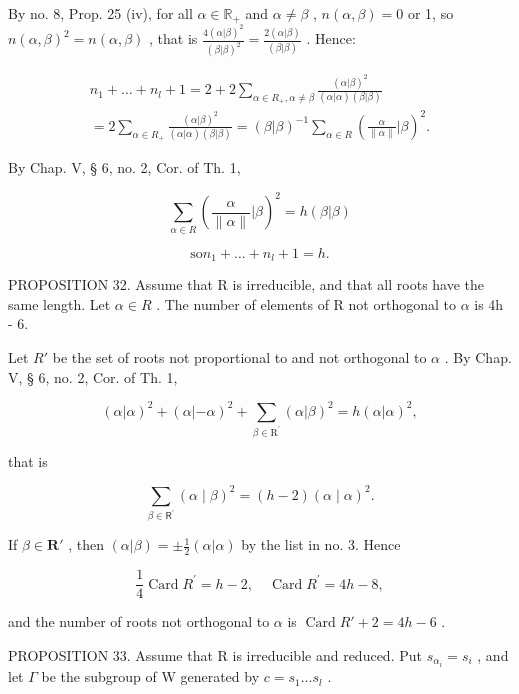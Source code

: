 By no. 8, Prop. 25 (iv), for all \(\alpha \in \mathbb{R}_+\) and \(\alpha \neq \beta\) , \(n(\alpha, \beta) = 0\) or 1, so \(n(\alpha, \beta)^2 = n(\alpha, \beta)\) , that is \(\frac{4(\alpha | \beta)^2}{(\beta | \beta)^2} = \frac{2(\alpha | \beta)}{(\beta | \beta)}\) . Hence:

\[
\begin{array}{l} n _ {1} + \dots + n _ {l} + 1 = 2 + 2 \sum_ {\alpha \in R _ {+}, \alpha \neq \beta} \frac {(\alpha | \beta) ^ {2}}{(\alpha | \alpha) (\beta | \beta)} \\ = 2 \sum_ {\alpha \in R _ {+}} \frac {(\alpha | \beta) ^ {2}}{(\alpha | \alpha) (\beta | \beta)} = (\beta | \beta) ^ {- 1} \sum_ {\alpha \in R} (\frac {\alpha}{\| \alpha \|} | \beta) ^ {2}. \end{array}
\]

By Chap. V, § 6, no. 2, Cor. of Th. 1,

\[
\sum_ {\alpha \in R} \left(\frac {\alpha}{\| \alpha \|} | \beta\right) ^ {2} = h (\beta | \beta)
\]

\[
\mathrm{so} n _ {1} + \dots + n _ {l} + 1 = h.
\]

PROPOSITION 32. Assume that R is irreducible, and that all roots have the same length. Let \(\alpha \in R\) . The number of elements of R not orthogonal to \(\alpha\) is 4h - 6.

Let \(R'\) be the set of roots not proportional to and not orthogonal to \(\alpha\) . By Chap. V, § 6, no. 2, Cor. of Th. 1,

\[
(\alpha | \alpha) ^ {2} + (\alpha | - \alpha) ^ {2} + \sum_ {\beta \in \mathrm{R} ^ {\prime}} (\alpha | \beta) ^ {2} = h (\alpha | \alpha) ^ {2},
\]

that is

\[
\sum_ {\beta \in \mathsf {R} ^ {\prime}} (\alpha \mid \beta) ^ {2} = (h - 2) (\alpha \mid \alpha) ^ {2}.
\]

If \(\beta \in \mathbf{R}'\) , then \((\alpha | \beta) = \pm \frac{1}{2} (\alpha | \alpha)\) by the list in no. 3. Hence

\[
\frac {1}{4} \operatorname{Card} R ^ {\prime} = h - 2, \quad \operatorname{Card} R ^ {\prime} = 4 h - 8,
\]

and the number of roots not orthogonal to \(\alpha\) is \(\operatorname{Card} R' + 2 = 4h - 6\) .

PROPOSITION 33. Assume that R is irreducible and reduced. Put \(s_{\alpha_i} = s_i\) , and let \(\Gamma\) be the subgroup of W generated by \(c = s_1 \ldots s_l\) .

